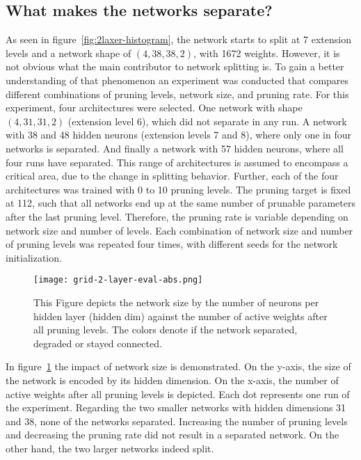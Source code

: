 \subsection{What makes the networks separate?}
As seen in figure~\ref{fig:2laxer-histogram}, the network starts to split at 7 extension levels and a network shape of $(4,38,38,2)$, with 1672 weights.
However, it is not obvious what the main contributor to network splitting is.
To gain a better understanding of that phenomenon an experiment was conducted that compares different combinations of pruning levels, network size, and pruning rate.
For this experiment, four architectures were selected.
One network with shape $(4,31,31,2)$ (extension level 6), which did not separate in any run.
A network with 38 and 48 hidden neurons (extension levels 7 and 8), where only one in four networks is separated.
And finally a network with 57 hidden neurons, where all four runs have separated.
This range of architectures is assumed to encompass a critical area, due to the change in splitting behavior.
Further, each of the four architectures was trained with 0 to 10 pruning levels.
The pruning target is fixed at 112, such that all networks end up at the same number of prunable parameters after the last pruning level.
Therefore, the pruning rate is variable depending on network size and number of levels.
Each combination of network size and number of pruning levels was repeated four times, with different seeds for the network initialization.

\begin{figure}[ht]
    \centering
    \texttt{[image: grid-2-layer-eval-abs.png]}
    \caption{This Figure depicts the network size by the number of neurons per hidden layer (hidden dim) against the number of active weights after all pruning levels.
    The colors denote if the network separated, degraded or stayed connected.}\label{fig:grid-1}
\end{figure}

In figure~\ref{fig:grid-1} the impact of network size is demonstrated.
On the y-axis, the size of the network is encoded by its hidden dimension.
On the x-axis, the number of active weights after all pruning levels is depicted.
Each dot represents one run of the experiment.
Regarding the two smaller networks with hidden dimensions 31 and 38, none of the networks separated. 
Increasing the number of pruning levels and decreasing the pruning rate did not result in a separated network.
On the other hand, the two larger networks indeed split.

